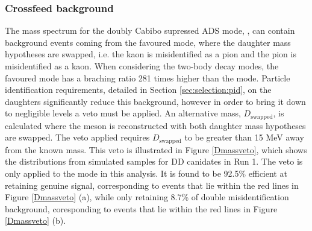 %
%

\subsubsection{Crossfeed background}
\label{sec:backgrounds:crossfeed}

The \Bm mass spectrum for the doubly Cabibo supressed ADS mode, \pik, can contain background events coming from the favoured \kpi mode, where the \Dz daughter mass hypotheses are swapped, i.e. the kaon is misidentified as a pion and the pion is misidentified as a kaon. When considering the two-body \Dz decay modes, the favoured \kpi mode has a braching ratio 281 times higher than the \pik mode. Particle identification requirements, detailed in Section \ref{sec:selection:pid}, on the \Dz daughters significantly reduce this background, however in order to bring it down to negligible levels a veto must be applied. An alternative \Dz mass, $D_{\text{swapped}}$, is calculated where the \Dz meson is reconstructed with both daughter mass hypotheses are swapped. The veto applied requires $D_{\text{swapped}}$ to be greater than 15 MeV away from the known \Dz mass. This veto is illustrated in Figure \ref{Dmassveto}, which shows the distributions from simulated samples for DD canidates in Run 1. The veto is only applied to the \pik mode in this analysis. It is found to be 92.5\% efficient at retaining genuine signal, corresponding to events that lie within the red lines in Figure \ref{Dmassveto} (a), while only retaining 8.7\% of double misidentification background, coresponding to events that lie within the red lines in Figure \ref{Dmassveto} (b). 

